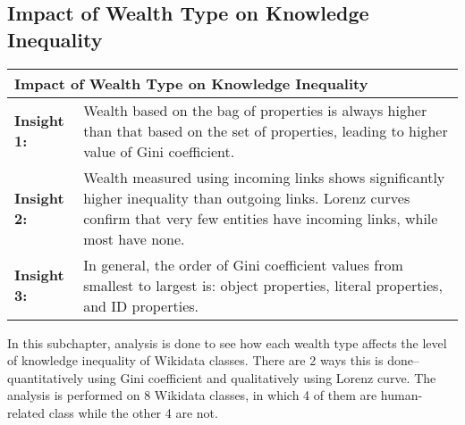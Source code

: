 \subsection{Impact of Wealth Type on Knowledge Inequality} \label{wealth & gini}

% 
% 
% 

\begin{table}[!htbp]
    \centering
    \renewcommand{\arraystretch}{1.3}
    \begin{tabular}{|l p{12cm}|} 
        \hline
        \multicolumn{2}{|l|}{\textbf{Impact of Wealth Type on Knowledge Inequality}} \\
        \hline
        \textbf{Insight 1:} & Wealth based on the bag of properties is always higher than that based on the set of properties, leading to higher value of Gini coefficient. \\
        \textbf{Insight 2:} & Wealth measured using incoming links shows significantly higher inequality than outgoing links. Lorenz curves confirm that very few entities have incoming links, while most have none. \\
        \textbf{Insight 3:} & In general, the order of Gini coefficient values from smallest to largest is: object properties, literal properties, and ID properties. \\
        \hline
    \end{tabular}
\end{table}

In this subchapter, analysis is done to see how each wealth type affects the level of knowledge inequality of Wikidata classes. There are 2 ways this is done--quantitatively using Gini coefficient and qualitatively using Lorenz curve. The analysis is performed on 8 Wikidata classes, in which 4 of them are human-related class while the other 4 are not.

